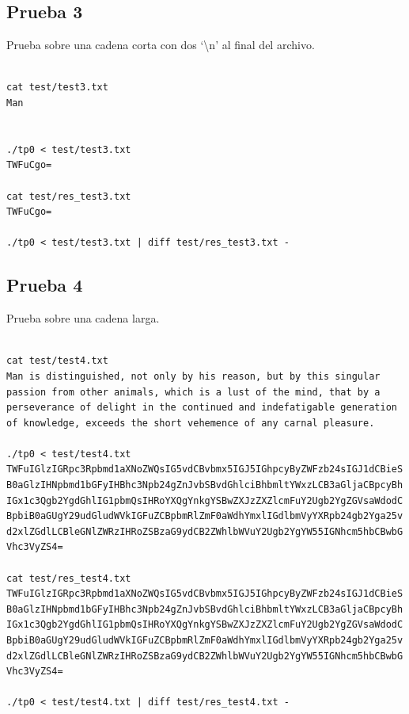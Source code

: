 \documentclass[titlepage,a4paper]{article}
\begin{document}
\subsection{Prueba 3}
Prueba sobre una cadena corta con dos `\textbackslash n' al final del archivo.
\begin{lstlisting}[style=test_run_style]

cat test/test3.txt
Man


./tp0 < test/test3.txt
TWFuCgo=

cat test/res_test3.txt
TWFuCgo=

./tp0 < test/test3.txt | diff test/res_test3.txt -

\end{lstlisting}

\subsection{Prueba 4}
Prueba sobre una cadena larga.
\begin{lstlisting}[style=test_run_style]

cat test/test4.txt
Man is distinguished, not only by his reason, but by this singular passion from other animals, which is a lust of the mind, that by a perseverance of delight in the continued and indefatigable generation of knowledge, exceeds the short vehemence of any carnal pleasure.

./tp0 < test/test4.txt
TWFuIGlzIGRpc3Rpbmd1aXNoZWQsIG5vdCBvbmx5IGJ5IGhpcyByZWFzb24sIGJ1dCBieS 
B0aGlzIHNpbmd1bGFyIHBhc3Npb24gZnJvbSBvdGhlciBhbmltYWxzLCB3aGljaCBpcyBh 
IGx1c3Qgb2YgdGhlIG1pbmQsIHRoYXQgYnkgYSBwZXJzZXZlcmFuY2Ugb2YgZGVsaWdodC 
BpbiB0aGUgY29udGludWVkIGFuZCBpbmRlZmF0aWdhYmxlIGdlbmVyYXRpb24gb2Yga25v 
d2xlZGdlLCBleGNlZWRzIHRoZSBzaG9ydCB2ZWhlbWVuY2Ugb2YgYW55IGNhcm5hbCBwbG 
Vhc3VyZS4=

cat test/res_test4.txt
TWFuIGlzIGRpc3Rpbmd1aXNoZWQsIG5vdCBvbmx5IGJ5IGhpcyByZWFzb24sIGJ1dCBieS 
B0aGlzIHNpbmd1bGFyIHBhc3Npb24gZnJvbSBvdGhlciBhbmltYWxzLCB3aGljaCBpcyBh 
IGx1c3Qgb2YgdGhlIG1pbmQsIHRoYXQgYnkgYSBwZXJzZXZlcmFuY2Ugb2YgZGVsaWdodC 
BpbiB0aGUgY29udGludWVkIGFuZCBpbmRlZmF0aWdhYmxlIGdlbmVyYXRpb24gb2Yga25v 
d2xlZGdlLCBleGNlZWRzIHRoZSBzaG9ydCB2ZWhlbWVuY2Ugb2YgYW55IGNhcm5hbCBwbG 
Vhc3VyZS4=

./tp0 < test/test4.txt | diff test/res_test4.txt -

\end{lstlisting}
\end{document}
